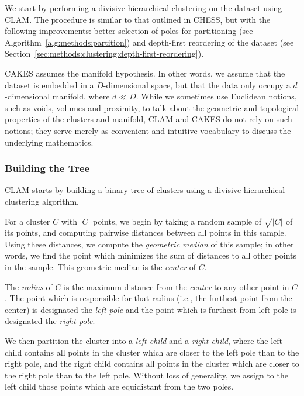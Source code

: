 We start by performing a divisive hierarchical clustering on the dataset using CLAM.
The procedure is similar to that outlined in CHESS, but with the following improvements:
better selection of poles for partitioning (see Algorithm~\ref{alg:methods:partition}) and depth-first reordering of the dataset (see Section~\ref{sec:methods:clustering:depth-first-reordering}).

CAKES assumes the manifold hypothesis.
In other words, we assume that the dataset is embedded in a $D$-dimensional space, but that the data only occupy a $d$-dimensional manifold, where $d \ll D$.
While we sometimes use Euclidean notions, such as voids, volumes and proximity, to talk about the geometric and topological properties of the clusters and manifold, CLAM and CAKES do not rely on such notions;
they serve merely as convenient and intuitive vocabulary to discuss the underlying mathematics.


\subsubsection{Building the Tree}
\label{sec:methods:clustering:building-the-tree}

CLAM starts by building a binary tree of clusters using a divisive hierarchical clustering algorithm.

For a cluster $C$ with $|C|$ points, we begin by taking a random sample of $\sqrt{|C|}$ of its points, and computing pairwise distances between all points in this sample.
Using these distances, we compute the \emph{geometric median} of this sample; in other words, we find the point which minimizes the sum of distances to all other points in the sample.
This geometric median is the \emph{center} of $C$.

The \emph{radius} of $C$ is the maximum distance from the \emph{center} to any other point in $C$.
The point which is responsible for that radius (i.e., the furthest point from the center) is designated the \emph{left pole} and the point which is furthest from left pole is designated the \emph{right pole}.

We then partition the cluster into a \emph{left child} and a \emph{right child}, where the left child contains all points in the cluster which are closer to the left pole than to the right pole, and the right child contains all points in the cluster which are closer to the right pole than to the left pole.
Without loss of generality, we assign to the left child those points which are equidistant from the two poles.

